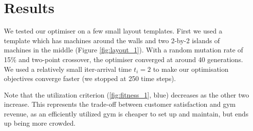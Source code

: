 \documentclass[9pt]{pnas-new}
\begin{document}
\section*{Results}

We tested our optimiser on a few small layout templates. First we used a template which has machines around the walls and two 2-by-2 islands of machines in the middle (Figure \ref{fig:layout_1}). With a random mutation rate of 15\% and two-point crossover, the optimiser converged at around 40 generations.
We used a relatively small iter-arrival time $t_i = 2$ to make our optimisation objectives converge faster (we stopped at 250 time steps).

Note that the utilization criterion (\ref{fig:fitness_1}, blue) decreases as the other two increase. This represents the trade-off between customer satisfaction and gym revenue, as an efficiently utilized gym is cheaper to set up and maintain, but ends up being more crowded.
\end{document}
